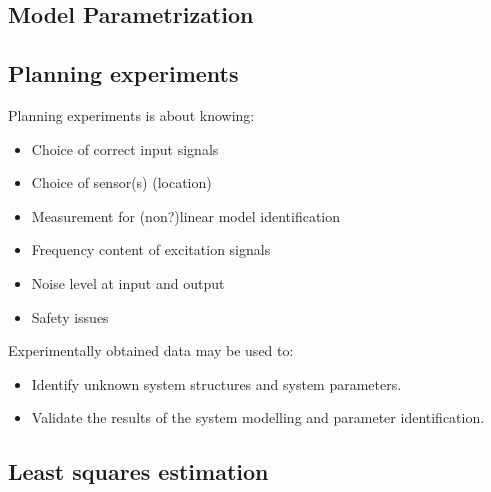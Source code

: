\documentclass[10pt,a4paper]{scrartcl}
\begin{document}
\begin{multicols*}{3}



\vfill

\null

\columnbreak

\section{Model Parametrization}

\subsection{Planning experiments}

Planning experiments is about knowing:
\begin{itemize}
\compaq
\item Choice of correct input signals
\item Choice of sensor(s) (location)
\item Measurement for (non?)linear model identification
\item Frequency content of excitation signals
\item Noise level at input and output
\item Safety issues
\end{itemize}

Experimentally obtained data may be used to:

\begin{itemize}
\ncompaq
\item Identify unknown system structures and system parameters.
\item Validate the results of the system modelling and parameter identification.
\end{itemize}


\subsection{Least squares estimation}


\end{multicols*}
\end{document}
